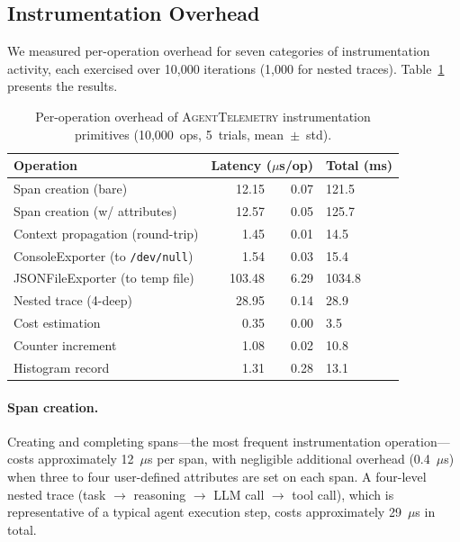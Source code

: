 \documentclass[sigconf,nonacm]{acmart}
\begin{document}
\subsection{Instrumentation Overhead}
\label{sec:overhead}

We measured per-operation overhead for seven categories of
instrumentation activity, each exercised over 10{,}000 iterations
(1{,}000 for nested traces). Table~\ref{tab:overhead} presents the
results.

\begin{table}[t]
\centering
\small
\caption{Per-operation overhead of \textsc{AgentTelemetry} instrumentation
primitives (10{,}000~ops, 5~trials, mean~$\pm$~std).}
\label{tab:overhead}
\begin{tabular}{@{}lr@{~$\pm$~}rl@{}}
\toprule
\textbf{Operation} & \multicolumn{2}{c}{\textbf{Latency ($\mu$s/op)}} & \textbf{Total (ms)} \\
\midrule
Span creation (bare)           & 12.15 & 0.07 & 121.5 \\
Span creation (w/ attributes)  & 12.57 & 0.05 & 125.7 \\
Context propagation (round-trip) & 1.45 & 0.01 &  14.5 \\
ConsoleExporter (to \texttt{/dev/null})  & 1.54 & 0.03 &  15.4 \\
JSONFileExporter (to temp file) & 103.48 & 6.29 & 1034.8 \\
Nested trace (4-deep)          & 28.95 & 0.14 &  28.9 \\
Cost estimation                &  0.35 & 0.00 &   3.5 \\
Counter increment              &  1.08 & 0.02 &  10.8 \\
Histogram record               &  1.31 & 0.28 &  13.1 \\
\bottomrule
\end{tabular}
\end{table}

\paragraph{Span creation.}
Creating and completing spans---the most frequent instrumentation
operation---costs approximately 12~$\mu$s per span, with negligible
additional overhead (0.4~$\mu$s) when three to four user-defined
attributes are set on each span.  A four-level nested trace (task
$\rightarrow$ reasoning $\rightarrow$ LLM call $\rightarrow$ tool call),
which is representative of a typical agent execution step, costs
approximately 29~$\mu$s in total.
\end{document}
